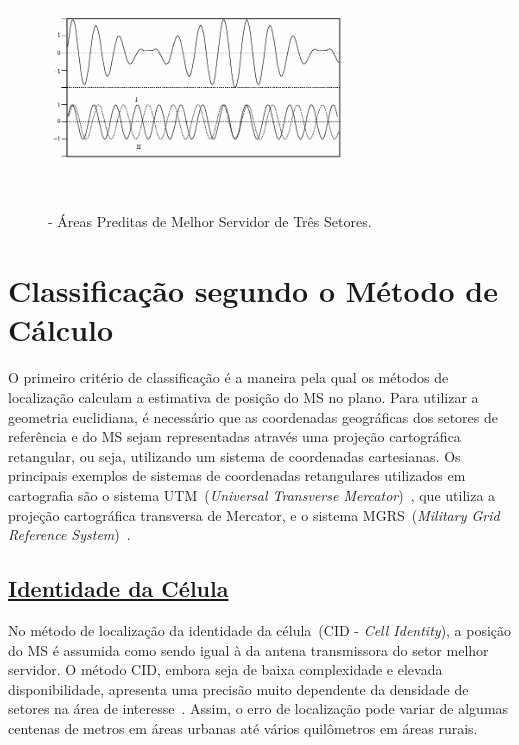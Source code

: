 \begin{figure}[H]
\begin{center}
\includegraphics[width=8cm,height=6.4cm]{./02_Capitulos/02_Cap1/figures/fig_06_br.png}
\caption{\label{fig:bestserverarea}- Áreas Preditas de Melhor Servidor de Três Setores.}
\end{center}
\end{figure}

\section{\textbf{Classificação segundo o Método de Cálculo}}
\label{sec:Cap1Metodo}

O primeiro critério de classificação é a maneira pela qual os métodos de localização calculam a estimativa de posição do MS no plano. Para utilizar a geometria euclidiana, é necessário que as coordenadas geográficas dos setores de referência e do MS sejam representadas através uma projeção cartográfica retangular, ou seja, utilizando um sistema de coordenadas cartesianas. Os principais exemplos de sistemas de coordenadas retangulares utilizados em cartografia são o sistema UTM~(\textit{Universal Transverse Mercator})~\cite{Geocartografia}, que utiliza a projeção cartográfica transversa de Mercator, e o sistema MGRS~(\textit{Military Grid Reference System})~\cite{MGRS}.

\subsection{\underline{Identidade da Célula}}
\label{subsec:Cap1Cid}

No método de localização da identidade da célula~(CID - \textit{Cell Identity}), a posição do MS é assumida como sendo igual à da antena transmissora do setor melhor servidor. O método CID, embora seja de baixa complexidade e elevada disponibilidade, apresenta uma precisão muito dependente da densidade de setores na área de interesse~\cite{SPAWC2008}. Assim, o erro de localização pode variar de algumas centenas de metros em áreas urbanas até vários quilômetros em áreas rurais.

